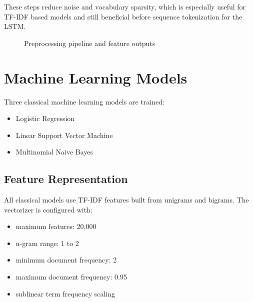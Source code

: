 \documentclass[12pt,a4paper]{article}
\begin{document}
These steps reduce noise and vocabulary sparsity, which is especially useful for TF-IDF based models and still beneficial before sequence tokenization for the LSTM.

\begin{figure}[H]
\centering
{}
\caption{Preprocessing pipeline and feature outputs}
\label{fig:preprocessing}
\end{figure}

\section{Machine Learning Models}
Three classical machine learning models are trained:
\begin{itemize}[leftmargin=*]
\item Logistic Regression
\item Linear Support Vector Machine
\item Multinomial Naive Bayes
\end{itemize}

\subsection{Feature Representation}
All classical models use TF-IDF features built from unigrams and bigrams. The vectorizer is configured with:
\begin{itemize}[leftmargin=*]
\item maximum features: 20,000
\item n-gram range: 1 to 2
\item minimum document frequency: 2
\item maximum document frequency: 0.95
\item sublinear term frequency scaling
\end{itemize}
\end{document}
